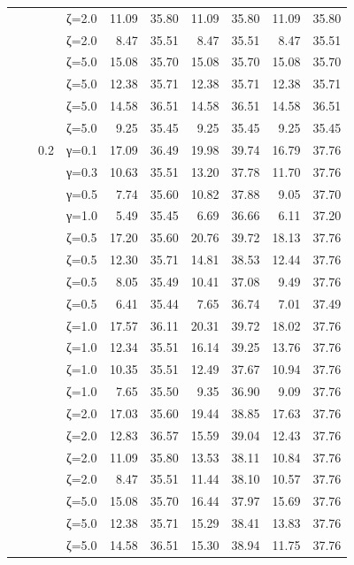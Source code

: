 \begin{table}[htbp]
\begin{tabular}{ll r l  rr  rr  rr}
  &  &  & ζ=2.0 & 11.09 & 35.80 & 11.09 & 35.80 & 11.09 & 35.80 \\
  &  &  & ζ=2.0 & 8.47 & 35.51 & 8.47 & 35.51 & 8.47 & 35.51 \\
  &  &  & ζ=5.0 & 15.08 & 35.70 & 15.08 & 35.70 & 15.08 & 35.70 \\
  &  &  & ζ=5.0 & 12.38 & 35.71 & 12.38 & 35.71 & 12.38 & 35.71 \\
  &  &  & ζ=5.0 & 14.58 & 36.51 & 14.58 & 36.51 & 14.58 & 36.51 \\
  &  &  & ζ=5.0 & 9.25 & 35.45 & 9.25 & 35.45 & 9.25 & 35.45 \\
  &  & 0.2 & γ=0.1 & 17.09 & 36.49 & 19.98 & 39.74 & 16.79 & 37.76 \\
  &  &  & γ=0.3 & 10.63 & 35.51 & 13.20 & 37.78 & 11.70 & 37.76 \\
  &  &  & γ=0.5 & 7.74 & 35.60 & 10.82 & 37.88 & 9.05 & 37.70 \\
  &  &  & γ=1.0 & 5.49 & 35.45 & 6.69 & 36.66 & 6.11 & 37.20 \\
  &  &  & ζ=0.5 & 17.20 & 35.60 & 20.76 & 39.72 & 18.13 & 37.76 \\
  &  &  & ζ=0.5 & 12.30 & 35.71 & 14.81 & 38.53 & 12.44 & 37.76 \\
  &  &  & ζ=0.5 & 8.05 & 35.49 & 10.41 & 37.08 & 9.49 & 37.76 \\
  &  &  & ζ=0.5 & 6.41 & 35.44 & 7.65 & 36.74 & 7.01 & 37.49 \\
  &  &  & ζ=1.0 & 17.57 & 36.11 & 20.31 & 39.72 & 18.02 & 37.76 \\
  &  &  & ζ=1.0 & 12.34 & 35.51 & 16.14 & 39.25 & 13.76 & 37.76 \\
  &  &  & ζ=1.0 & 10.35 & 35.51 & 12.49 & 37.67 & 10.94 & 37.76 \\
  &  &  & ζ=1.0 & 7.65 & 35.50 & 9.35 & 36.90 & 9.09 & 37.76 \\
  &  &  & ζ=2.0 & 17.03 & 35.60 & 19.44 & 38.85 & 17.63 & 37.76 \\
  &  &  & ζ=2.0 & 12.83 & 36.57 & 15.59 & 39.04 & 12.43 & 37.76 \\
  &  &  & ζ=2.0 & 11.09 & 35.80 & 13.53 & 38.11 & 10.84 & 37.76 \\
  &  &  & ζ=2.0 & 8.47 & 35.51 & 11.44 & 38.10 & 10.57 & 37.76 \\
  &  &  & ζ=5.0 & 15.08 & 35.70 & 16.44 & 37.97 & 15.69 & 37.76 \\
  &  &  & ζ=5.0 & 12.38 & 35.71 & 15.29 & 38.41 & 13.83 & 37.76 \\
  &  &  & ζ=5.0 & 14.58 & 36.51 & 15.30 & 38.94 & 11.75 & 37.76 \\

\end{tabular}
\end{table}
